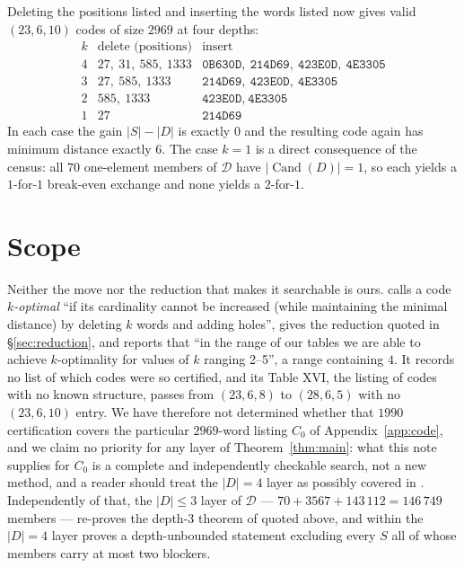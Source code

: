 \documentclass[11pt]{amsart}
\theoremstyle{remark}
\DeclareMathOperator{\Cand}{Cand}
\begin{document}
Deleting the positions listed and inserting the words listed now gives valid $(23,6,10)$
codes of size $2969$ at four depths:
\[
\begin{array}{c|l|l}
 k & \text{delete (positions)} & \text{insert}\\\hline
 4 & 27,\ 31,\ 585,\ 1333 & \texttt{0B630D},\ \texttt{214D69},\ \texttt{423E0D},\ \texttt{4E3305}\\
 3 & 27,\ 585,\ 1333       & \texttt{214D69},\ \texttt{423E0D},\ \texttt{4E3305}\\
 2 & 585,\ 1333            & \texttt{423E0D},\ \texttt{4E3305}\\
 1 & 27                    & \texttt{214D69}
\end{array}
\]
In each case the gain $|S|-|D|$ is exactly $0$ and the resulting code again has minimum
distance exactly $6$. The case $k=1$ is a direct consequence of the census: all $70$
one-element members of $\mathcal D$ have $|\Cand(D)|=1$, so each yields a $1$-for-$1$
break-even exchange and none yields a $2$-for-$1$.

\section{Scope}\label{sec:open}

Neither the move nor the reduction that makes it searchable is ours. \cite[\S XII]{BSSS} calls
a code \emph{$k$-optimal} ``if its cardinality cannot be increased (while maintaining the
minimal distance) by deleting $k$ words and adding holes'', gives the reduction quoted in
\S\ref{sec:reduction}, and reports that ``in the range of our tables we are able to achieve
$k$-optimality for values of $k$ ranging 2--5'', a range containing $4$. It records no list of
which codes were so certified, and its Table XVI, the listing of codes with no known
structure, passes from $(23,6,8)$ to $(28,6,5)$ with no $(23,6,10)$ entry. We have therefore
not determined whether that $1990$ certification covers the particular $2969$-word listing
$C_0$ of Appendix~\ref{app:code}, and we claim no priority for any layer of
Theorem~\ref{thm:main}: what this note supplies for $C_0$ is a complete and independently
checkable search, not a new method, and a reader should treat the $|D|=4$ layer as possibly
covered in \cite[\S XII]{BSSS}. Independently of that, the $|D|\le3$ layer of $\mathcal D$ ---
$70+3567+143\,112=146\,749$ members --- re-proves the depth-$3$ theorem of \cite{Lys} quoted
above, and within the $|D|=4$ layer \cite{Lys} proves a depth-unbounded statement excluding
every $S$ all of whose members carry at most two blockers.
\end{document}
